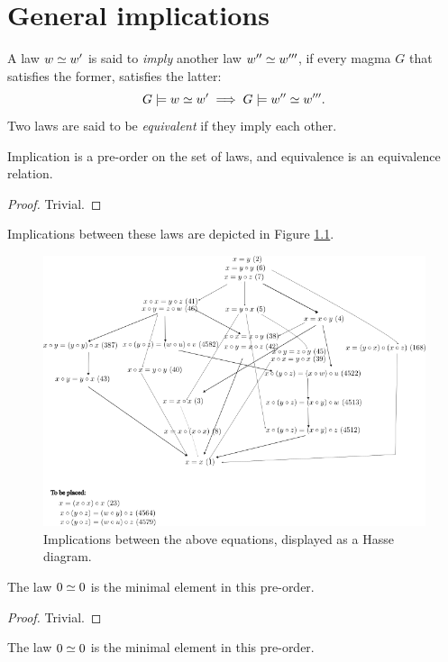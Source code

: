 \chapter{General implications}

\begin{definition}[Implication]\label{impl}  A law $w  \simeq  w'$ is said to \emph{imply} another law $w''  \simeq  w'''$, if every magma $G$ that satisfies the former, satisfies the latter:
  $$ G \models w  \simeq  w' \implies G \models w''  \simeq  w'''.$$
Two laws are said to be \emph{equivalent} if they imply each other.
\end{definition}

\begin{lemma}\label{pre-order}  Implication is a pre-order on the set of laws, and equivalence is an equivalence relation.
\end{lemma}

\begin{proof} Trivial.
\end{proof}

Implications between these laws are depicted in Figure \ref{fig:implications}.

\begin{figure}
  \centering
  \includegraphics[width=0.5\linewidth]{../../images/implications.png}
  \caption{Implications between the above equations, displayed as a Hasse diagram.}
  \label{fig:implications}
\end{figure}


\begin{lemma}\label{minimal}  The law $0  \simeq  0$ is the minimal element in this pre-order.
\end{lemma}

\begin{proof} Trivial.
\end{proof}

\begin{lemma}\label{maximal}  The law $0  \simeq  0$ is the minimal element in this pre-order.
\end{lemma}

